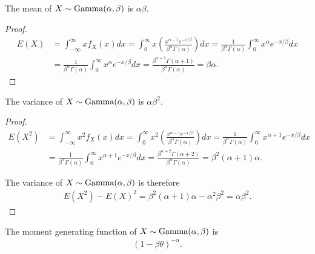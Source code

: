 \begin{prop}
    The mean of $X \sim \mathrm{Gamma}(\alpha, \beta)$ is $\alpha\beta$.
\end{prop}

\begin{proof}
    \begin{align*}
        E(X) &= \int_{-\infty}^{\infty}xf_X(x)dx = \int_{0}^{\infty}x\left(\frac{x^{\alpha-1}e^{-x/\beta}}{\beta^{\alpha}\Gamma(\alpha)}\right)dx = \frac{1}{\beta^{\alpha}\Gamma(\alpha)}\int_{0}^{\infty}x^{\alpha}e^{-x/\beta}dx \\
        &= \frac{1}{\beta^{\alpha}\Gamma(\alpha)}\int_{0}^{\infty}x^{\alpha}e^{-x/\beta}dx = \frac{\beta^{\alpha+1}\Gamma(\alpha+1)}{\beta^{\alpha}\Gamma(\alpha)} = \beta\alpha.
    \end{align*}
\end{proof}

\begin{prop}
    The variance of $X \sim \mathrm{Gamma}(\alpha, \beta)$ is $\alpha \beta^2$.
\end{prop}

\begin{proof}
    \begin{align*}
        E(X^2) &= \int_{-\infty}^{\infty}x^2f_X(x)dx = \int_{0}^{\infty}x^2\left(\frac{x^{\alpha-1}e^{-x/\beta}}{\beta^{\alpha}\Gamma(\alpha)}\right)dx = \frac{1}{\beta^{\alpha}\Gamma(\alpha)}\int_{0}^{\infty}x^{\alpha+1}e^{-x/\beta}dx \\
        &= \frac{1}{\beta^{\alpha}\Gamma(\alpha)}\int_{0}^{\infty}x^{\alpha+1}e^{-x/\beta}dx = \frac{\beta^{\alpha+2}\Gamma(\alpha+2)}{\beta^{\alpha}\Gamma(\alpha)} = \beta^2(\alpha+1)\alpha.
    \end{align*}

    The variance of $X \sim \mathrm{Gamma}(\alpha, \beta)$ is therefore
    \begin{align*}
        E(X^2) - E(X)^2 = \beta^2(\alpha+1)\alpha - \alpha^2\beta^2 = \alpha\beta^2.
    \end{align*}
\end{proof}

\begin{prop}
    The moment generating function of $X \sim \mathrm{Gamma}(\alpha, \beta)$ is
    \begin{align*}
        \left(1 - \beta\theta\right)^{-\alpha}.
    \end{align*}
\end{prop}

